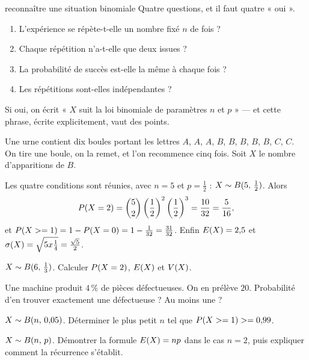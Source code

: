 \begin{methode}{reconnaître une situation binomiale}
Quatre questions, et il faut quatre « oui ».
\begin{enumerate}[label=\textbf{\arabic*.}, leftmargin=*, itemsep=0.15em]
  \item L'expérience se répète-t-elle un nombre fixé $n$ de fois ?
  \item Chaque répétition n'a-t-elle que deux issues ?
  \item La probabilité de succès est-elle la même à chaque fois ?
  \item Les répétitions sont-elles indépendantes ?
\end{enumerate}
Si oui, on écrit « $X$ suit la loi binomiale de paramètres $n$ et $p$ » — et
cette phrase, écrite explicitement, vaut des points.
\end{methode}

\begin{exemple}
Une urne contient dix boules portant les lettres $A$, $A$, $A$, $B$, $B$,
$B$, $B$, $B$, $C$, $C$. On tire une boule, on la remet, et l'on recommence
cinq fois. Soit $X$ le nombre d'apparitions de $B$.

Les quatre conditions sont réunies, avec $n = 5$ et $p = \frac12$ :
$X \sim \loibin{5}{\frac12}$. Alors
\[
  \proba{X = 2} = \combi{2}{5}\left(\frac12\right)^{2}
  \left(\frac12\right)^{3} = \frac{10}{32} = \frac{5}{16},
\]
et $\proba{X \geq 1} = 1-\proba{X = 0} = 1-\frac{1}{32} = \frac{31}{32}$.
Enfin $\Esp(X) = 2{,}5$ et $\ecart(X) = \sqrt{5 \times \frac14}
= \frac{\sqrt5}{2}$.
\end{exemple}

\begin{entrainement}
\exo[\niveau{1}] $X \sim \loibin{6}{\frac13}$. Calculer $\proba{X = 2}$,
$\Esp(X)$ et $\Var(X)$.

\exo[\niveau{2}] Une machine produit $4\,\%$ de pièces défectueuses. On en
prélève $20$. Probabilité d'en trouver exactement une défectueuse ? Au moins
une ?

\exo[\niveau{2}] $X \sim \loibin{n}{0{,}05}$. Déterminer le plus petit $n$ tel
que $\proba{X \geq 1} \geq 0{,}99$.

\exo[\niveau{3}] $X \sim \loibin{n}{p}$. Démontrer la formule
$\Esp(X) = np$ dans le cas $n = 2$, puis expliquer comment la récurrence
s'établit.
\end{entrainement}

